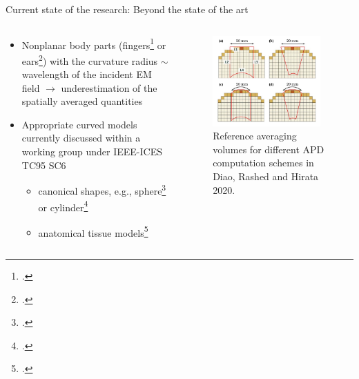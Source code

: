\documentclass[xcolor=dvipsnames,10pt]{beamer}
\begin{document}
\begin{frame}{Current state of the research: Beyond the state of the art}
    \begin{columns}[c]
        \begin{column}{0.5\textwidth}
            \begin{itemize}
                \item Nonplanar body parts (fingers\footcite{Li2012Mechanisms} or ears\footcite{Sacco2022Exposure}) with the curvature radius $\sim$ wavelength of the incident EM field $\rightarrow$ underestimation of the spatially averaged quantities
                \item Appropriate curved models currently discussed within a working group under IEEE-ICES TC95 SC6
                \begin{itemize}
                    \item canonical shapes, e.g., sphere\footcite{Kushiyama2022Absorbed,Kapetanovic2022Assessment} or cylinder\footcite{Diao2020Assessment,Kapetanovic2023Machine}
                    \item anatomical tissue models\footcite{Kapetanovic2023Area-averaged}
                \end{itemize}
            \end{itemize}
        \end{column}
        \begin{column}{0.5\textwidth}
            \begin{center}
            \begin{figure}
                \includegraphics[width=0.95\textwidth]{artwork/Diao2020Figure2_adjusted.pdf}
                \caption{Reference averaging volumes for different APD computation schemes in Diao, Rashed and Hirata 2020.}
            \end{figure}
            \end{center}
        \end{column}
    \end{columns}
\end{frame}
\end{document}
